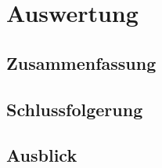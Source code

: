 \chapter{Auswertung}
\label{chap:schluss}
\section{Zusammenfassung}%
\label{sec:zusammenfassung}
\section{Schlussfolgerung}%
\label{sec:achlussfolgerung}
\section{Ausblick}%
\label{sec:ausblickC}
